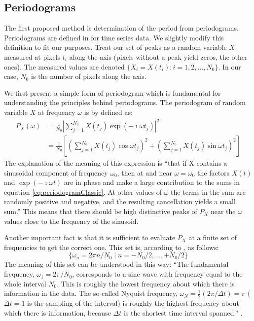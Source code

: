 \subsection{Periodograms}
\label{ssec:periodogram}
The first proposed method is determination of the period from periodograms. Periodograms are defined in \citep{Scargle1982} for time series data. We slightly modify this definition to fit our purposes. Treat our set of peaks as a random variable $X$ measured at pixels $t_i$ along the axis (pixels without a peak yield zeros, the other ones). The measured values are denoted $\lbrace X_i = X(t_i): i = 1, 2, \ldots, N_0 \rbrace$. In our case, $N_0$ is the number of pixels along the axis. 

We first present a simple form of periodogram which is fundamental for understanding the principles behind periodograms. The periodogram of random variable $X$ at frequency $\omega$ is by \citep{Scargle1982} defined as: 
\begin{align}
P_X(\omega) &= \frac{1}{N_0} {\left| \sum\limits_{j=1}^{N_0} X(t_j) \exp(-\imath\omega t_j) \right|}^2 \\
&= \frac{1}{N_0} \left[ \left( \sum\limits_{j=1}^{N_0} X(t_j)\cos\omega t_j \right)^2 + \left(\sum\limits_{j=1}^{N_0} X(t_j)\sin\omega t_j  \right)^2 \right]
\label{eq:periodogramClassic}
\end{align}
The explanation of the meaning of this expression is ``that if X contains a sinusoidal component of frequency $\omega_0$, then at and near $\omega = \omega_0$ the factors $X(t)$ and $\exp(-\imath\omega t)$ are in phase and make a large contribution to the sums in equation \eqref{eq:periodogramClassic}. At other values of $\omega$ the terms in the sum are randomly positive and negative, and the resulting cancellation yields a small sum.'' \citep[p.~836]{Scargle1982} This means that there should be high distinctive peaks of $P_X$ near the $\omega$ values close to the frequency of the sinusoid. 

Another important fact is that it is sufficient to evaluate $P_X$ at a finite set of frequencies to get the correct one. This set is, according to \citep[p.~850]{Scargle1982}, as follows:
$$ \lbrace \omega_n = 2\pi n / N_0 \mid n = -N_0/2, \ldots, +N_0/2 \rbrace $$
The meaning of this set can be understood in this way: ``The fundamental frequency, $\omega_1 = 2\pi / N_0$, corresponds to a sine wave with frequency equal to the whole interval $N_0$. This is roughly the lowest frequency about which there is information in the data. The so-called Nyquist frequency, $\omega_N = \frac{1}{2}(2\pi/{\Delta t}) = \pi$ ($\Delta t = 1$ is the sampling of the interval) is roughly the highest frequency about which there is information, because $\Delta t$ is the shortest time interval spanned.'' \citep[pp.~850--851]{Scargle1982}.

